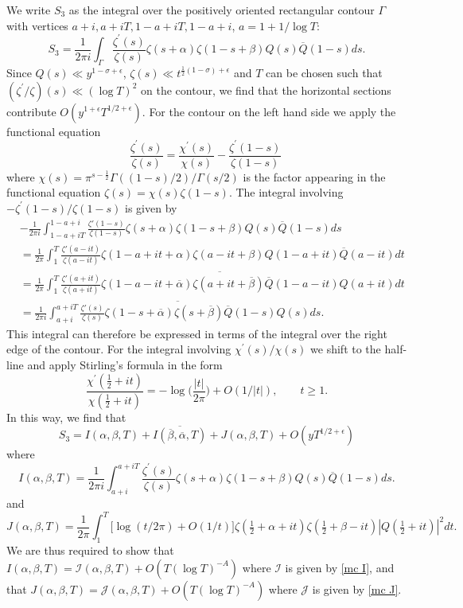 \documentclass[oneside, 12pt]{amsart}
\theoremstyle{definition}
\newcommand{\mc}{\mathcal}
\newcommand{\ol}{\overline}
\newcommand{\geqs}{\geqslant }
\newcommand{\ben}{\begin{equation}}
\newcommand{\een}{\end{equation} }
\begin{document}
We write $S_3$ as the integral over the positively oriented rectangular contour $\Gamma$ with vertices $a+i,a+iT,1-a+iT,1-a+i$, $a=1+1/\log T$:
\[
S_3=\frac{1}{2\pi i }\int_\Gamma \frac{\zeta^\prime(s)}{\zeta(s)}\zeta(s+\alpha)\zeta(1-s+\beta)Q(s)\overline{Q}(1-s)ds. 
\]
Since $Q(s)\ll y^{1-\sigma+\epsilon}$, $\zeta(s)\ll t^{\tfrac{1}{2}(1-\sigma)+\epsilon}$ and $T$ can be chosen such that $(\zeta^\prime/\zeta)(s)\ll (\log T)^2$ on the contour, we find that the horizontal sections contribute $O(y^{1+\epsilon}T^{1/2+\epsilon})$. For the contour on the left hand side we apply the functional equation
\[
\frac{\zeta^\prime(s)}{\zeta(s)}=\frac{\chi^\prime(s)}{\chi(s)}-\frac{\zeta^\prime(1-s)}{\zeta(1-s)}\
\]
where $\chi(s)=\pi^{s-\tfrac{1}{2}}\Gamma((1-s)/2)/\Gamma(s/2)$ is the factor appearing in the functional equation $\zeta(s)=\chi(s)\zeta(1-s)$. The integral involving $-\zeta^\prime(1-s)/\zeta(1-s)$ is given by 
\begin{align*}
&-\frac{1}{2\pi i}\int_{1-a+iT}^{1-a+i}\frac{\zeta'(1-s)}{\zeta(1-s)}\zeta(s+\alpha)\zeta(1-s+\beta)Q(s)\ol{Q}(1-s)ds\\
& = \frac{1}{2\pi }\int_{1}^T\frac{\zeta'(a-it)}{\zeta(a-it)}\zeta(1-a+it+\alpha)\zeta(a-it+\beta)Q(1-a+it)\ol{Q}(a-it)dt\\
& = \overline{\frac{1}{2\pi } \int_1^T \frac{\zeta'(a+it)}{\zeta(a+it)}\zeta(1-a-it+\overline{\alpha})\zeta(a+it+\overline{\beta})\ol{Q}(1-a-it)Q(a+it)dt}\\
& = \overline{\frac{1}{2\pi i}\int_{a+i}^{a+iT}\frac{\zeta'(s)}{\zeta(s)}\zeta(1-s+\overline{\alpha})\zeta(s+\overline{\beta})\ol{Q}(1-s)Q(s)ds}.
\end{align*}
This integral can therefore  be expressed in terms of the integral over the right edge of the contour.
For the integral involving $\chi^\prime(s)/\chi(s)$ we shift to the half-line and apply Stirling's formula in the form
\[
\frac{\chi^\prime(\tfrac{1}{2}+it)}{\chi(\tfrac{1}{2}+it)}=-\log\Big(\frac{|t|}{2\pi}\Big)+O(1/|t|),\qquad t\geqs 1.
\]  
In this way, we find that 
\[
S_3=I(\alpha, \beta,T)+\overline{I(\overline{\beta}, \overline{\alpha}, T)}+J(\alpha, \beta, T)+O(yT^{1/2+\epsilon})
\]
where
 \ben
\label{I}
I(\alpha, \beta,T)=\frac{1}{2\pi i}\int_{a+i}^{a+iT} \frac{\zeta^\prime(s)}{\zeta(s)}\zeta(s+\alpha)\zeta(1-s+\beta)Q(s)\overline{Q}(1-s)ds.
\een
and
\ben
\label{J}
J(\alpha, \beta, T)=\frac{1}{2\pi }\int_{1}^{T} \big[\log(t/2\pi)+O(1/t)]\zeta(\tfrac{1}{2}+\alpha+it)\zeta(\tfrac{1}{2}+\beta-it)|Q(\tfrac{1}{2}+it)|^2dt.
\een
We are thus required to show that $I(\alpha, \beta, T)=\mc{I}(\alpha,\beta,T)+O(T(\log T)^{-A})$ where $\mc{I}$ is given by \eqref{mc I}, and that 
$J(\alpha, \beta, T)=\mc{J}(\alpha, \beta, T)+O(T(\log T)^{-A})$ where $\mc{J}$ is given by \eqref{mc J}.
\end{document}
